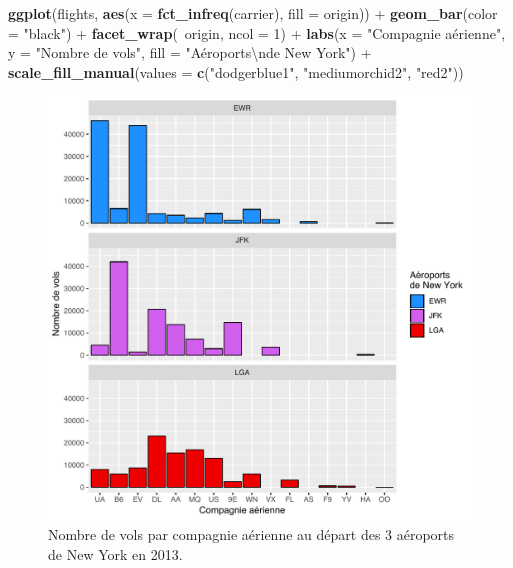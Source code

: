 \documentclass[a4paperpaper,]{article}
\newenvironment{Shaded}{\begin{snugshade}}{\end{snugshade}}
\newcommand{\CharTok}[1]{\textcolor[rgb]{0.57,0.30,0.62}{#1}}
\newcommand{\DataTypeTok}[1]{\textcolor[rgb]{0.00,0.34,0.68}{#1}}
\newcommand{\DecValTok}[1]{\textcolor[rgb]{0.69,0.50,0.00}{#1}}
\newcommand{\KeywordTok}[1]{\textcolor[rgb]{0.12,0.11,0.11}{\textbf{#1}}}
\newcommand{\NormalTok}[1]{\textcolor[rgb]{0.12,0.11,0.11}{#1}}
\newcommand{\OperatorTok}[1]{\textcolor[rgb]{0.12,0.11,0.11}{#1}}
\newcommand{\StringTok}[1]{\textcolor[rgb]{0.75,0.01,0.01}{#1}}
\begin{document}
\begin{Shaded}
\begin{Highlighting}[]
\KeywordTok{ggplot}\NormalTok{(flights, }\KeywordTok{aes}\NormalTok{(}\DataTypeTok{x =} \KeywordTok{fct_infreq}\NormalTok{(carrier), }\DataTypeTok{fill =}\NormalTok{ origin)) }\OperatorTok{+}
\StringTok{  }\KeywordTok{geom_bar}\NormalTok{(}\DataTypeTok{color =} \StringTok{"black"}\NormalTok{) }\OperatorTok{+}
\StringTok{  }\KeywordTok{facet_wrap}\NormalTok{(}\OperatorTok{~}\NormalTok{origin, }\DataTypeTok{ncol =} \DecValTok{1}\NormalTok{) }\OperatorTok{+}
\StringTok{  }\KeywordTok{labs}\NormalTok{(}\DataTypeTok{x =} \StringTok{"Compagnie aérienne"}\NormalTok{,}
       \DataTypeTok{y =} \StringTok{"Nombre de vols"}\NormalTok{,}
       \DataTypeTok{fill =} \StringTok{"Aéroports}\CharTok{\textbackslash{}n}\StringTok{de New York"}\NormalTok{) }\OperatorTok{+}
\StringTok{  }\KeywordTok{scale_fill_manual}\NormalTok{(}\DataTypeTok{values =} \KeywordTok{c}\NormalTok{(}\StringTok{"dodgerblue1"}\NormalTok{, }\StringTok{"mediumorchid2"}\NormalTok{, }\StringTok{"red2"}\NormalTok{))}
\end{Highlighting}
\end{Shaded}

\begin{figure}[htpb]

{\centering \includegraphics[width=0.9\linewidth]{figure/barfacetmanual-1} 

}

\caption{Nombre de vols par compagnie aérienne au départ des 3 aéroports de New York en 2013.}\label{fig:barfacetmanual}
\end{figure}
\end{document}
